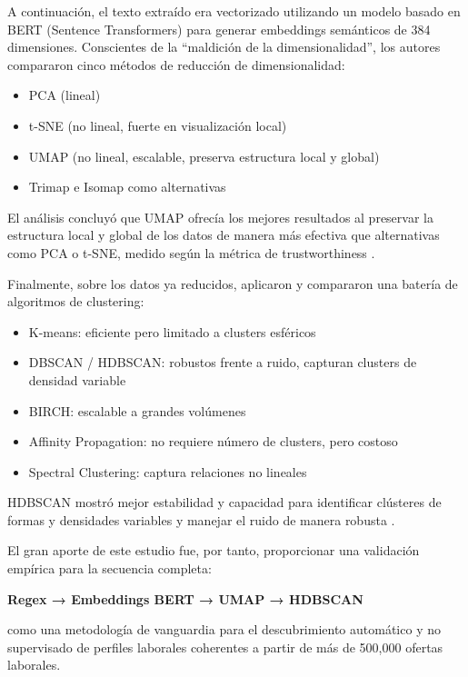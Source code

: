 A continuación, el texto extraído era vectorizado utilizando un modelo basado en BERT (Sentence Transformers) para generar embeddings semánticos de 384 dimensiones. Conscientes de la ``maldición de la dimensionalidad'', los autores compararon cinco métodos de reducción de dimensionalidad:

\begin{itemize}
    \item PCA (lineal)
    \item t-SNE (no lineal, fuerte en visualización local)
    \item UMAP (no lineal, escalable, preserva estructura local y global)
    \item Trimap e Isomap como alternativas
\end{itemize}

El análisis concluyó que UMAP ofrecía los mejores resultados al preservar la estructura local y global de los datos de manera más efectiva que alternativas como PCA o t-SNE, medido según la métrica de trustworthiness \parencite{lukauskas2023}.

Finalmente, sobre los datos ya reducidos, aplicaron y compararon una batería de algoritmos de clustering:

\begin{itemize}
    \item K-means: eficiente pero limitado a clusters esféricos
    \item DBSCAN / HDBSCAN: robustos frente a ruido, capturan clusters de densidad variable
    \item BIRCH: escalable a grandes volúmenes
    \item Affinity Propagation: no requiere número de clusters, pero costoso
    \item Spectral Clustering: captura relaciones no lineales
\end{itemize}

HDBSCAN mostró mejor estabilidad y capacidad para identificar clústeres de formas y densidades variables y manejar el ruido de manera robusta \parencite{lukauskas2023}.

El gran aporte de este estudio fue, por tanto, proporcionar una validación empírica para la secuencia completa:

\textbf{Regex → Embeddings BERT → UMAP → HDBSCAN}

como una metodología de vanguardia para el descubrimiento automático y no supervisado de perfiles laborales coherentes a partir de más de 500,000 ofertas laborales.

